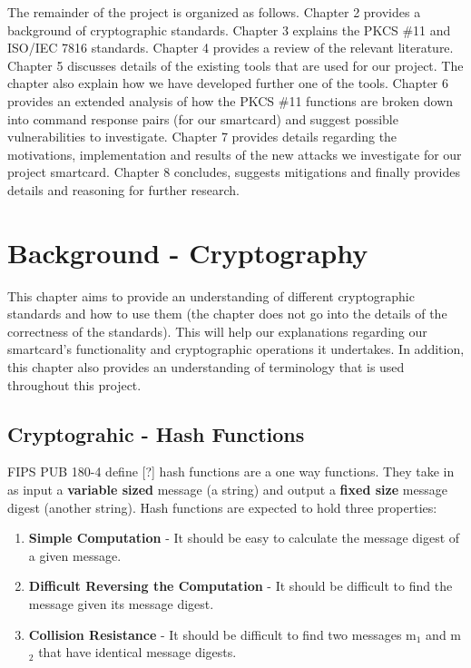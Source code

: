\documentclass[bsc,frontabs,twoside,singlespacing,parskip,deptreport]{infthesis}     %
\begin{document}
The remainder of the project is organized as follows. Chapter 2 provides a background of cryptographic standards. Chapter 3 explains the PKCS \#11 and ISO/IEC 7816 standards. Chapter 4 provides a review of the relevant literature. Chapter 5 discusses details of the existing tools that are used for our project. The chapter also explain how we have developed further one of the tools. Chapter 6 provides an extended analysis of how the PKCS \#11 functions are broken down into command response pairs (for our smartcard) and suggest possible vulnerabilities to investigate. Chapter 7 provides details regarding the motivations, implementation and results of the new attacks we investigate for our project smartcard. Chapter 8 concludes, suggests mitigations and finally provides details and reasoning for further research.



\chapter{Background - Cryptography}

This chapter aims to provide an understanding of different cryptographic standards and how to use them (the chapter does not go into the details of the correctness of the standards). This will help our explanations regarding our smartcard's functionality and cryptographic operations it undertakes. In addition, this chapter also provides an understanding of terminology that is used throughout this project.

\section{Cryptograhic - Hash Functions}

FIPS PUB 180-4 define [?] hash functions are a one way functions. They take in as input a \textbf{variable sized} message (a string) and output a \textbf{fixed size} message digest (another string). Hash functions are expected to hold three properties:
\begin{enumerate}
\item \textbf{Simple Computation} - It should be easy to calculate the message digest of a given message.
\item \textbf{Difficult Reversing the Computation} - It should be difficult to find the message given its message digest.
\item \textbf{Collision Resistance} - It should be difficult to find two messages m$_1$ and m$_2$ that have identical message digests.
\end{enumerate}
\end{document}
